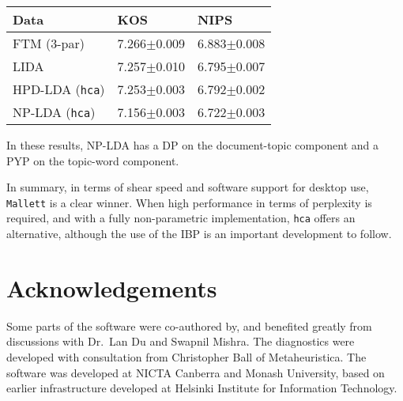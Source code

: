 \documentclass[twoside,11pt]{article}
\begin{document}
\begin{tabular}{l|ll}
Data & KOS & NIPS \\\hline
FTM (3-par) & 7.266$\pm$0.009 & 6.883$\pm$0.008 \\
LIDA & 7.257$\pm$0.010 & 6.795$\pm$0.007 \\\hline
HPD-LDA ({\tt hca})& 7.253$\pm$0.003 & 6.792$\pm$0.002  \\
NP-LDA  ({\tt hca})& 7.156$\pm$0.003 & 6.722$\pm$0.003
\end{tabular}

\noindent
In these results, 
NP-LDA has a DP on the document-topic component
and a PYP on the topic-word component.

In summary, in terms of shear speed and software support for
desktop use,
{\tt Mallett} is a clear winner.  When high performance
in terms of perplexity is required, and
with a fully non-parametric implementation,
{\tt hca} offers an alternative,
although the use of the IBP is an important development to follow.

\section*{Acknowledgements}
{Some parts of the software were co-authored by, and benefited greatly
  from discussions with Dr.\ Lan Du and Swapnil Mishra.
  The diagnostics were developed with consultation from Christopher Ball of
  Metaheuristica.
  The software was developed at NICTA Canberra and Monash University,
  based on earlier infrastructure developed at
  Helsinki Institute for Information Technology.
}



\end{document}
